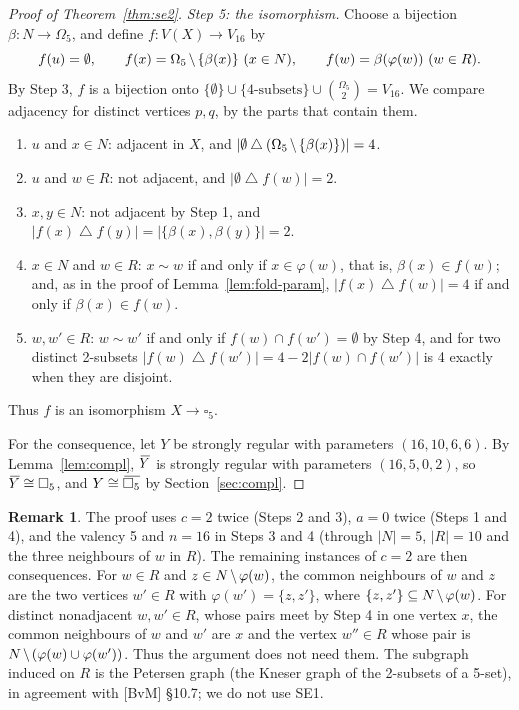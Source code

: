 \documentclass[11pt]{amsart}
\newcommand\comp[1]{{\mkern2mu\overline{\mkern-2mu#1}}}
\newcommand\diff{\mathbin{\mkern-1.5mu\setminus\mkern-1.5mu}}%
\theoremstyle{definition}
\newtheorem{remark}[theorem]{Remark}
\newcommand{\nb}{N}
\newcommand{\sd}{\mathbin{\triangle}}
\begin{document}
\begin{proof}[Proof of Theorem~\ref{thm:se2}]
\emph{Step 5: the isomorphism.} Choose a bijection $\beta\colon\nb\to\Omega_5$, and define
$f\colon V(X)\to V_{16}$ by
\[
f(u)=\emptyset,\qquad f(x)=\Omega_5\diff\{\beta(x)\}\ (x\in\nb),\qquad
f(w)=\beta(\varphi(w))\ (w\in R).
\]
By Step 3, $f$ is a bijection onto $\{\emptyset\}\cup\{\text{4-subsets}\}\cup\binom{\Omega_5}{2}=
V_{16}$. We compare adjacency for distinct vertices $p,q$, by the parts that contain them.
\begin{enumerate}
\item $u$ and $x\in\nb$: adjacent in $X$, and $\lvert\emptyset\sd(\Omega_5\diff\{\beta(x)\})\rvert=
4$.
\item $u$ and $w\in R$: not adjacent, and $\lvert\emptyset\sd f(w)\rvert=2$.
\item $x,y\in\nb$: not adjacent by Step 1, and $\lvert f(x)\sd f(y)\rvert=\lvert\{\beta(x),
\beta(y)\}\rvert=2$.
\item $x\in\nb$ and $w\in R$: $x\sim w$ if and only if $x\in\varphi(w)$, that is, $\beta(x)\in
f(w)$; and, as in the proof of Lemma~\ref{lem:fold-param}, $\lvert f(x)\sd f(w)\rvert=4$ if and
only if $\beta(x)\in f(w)$.
\item $w,w'\in R$: $w\sim w'$ if and only if $f(w)\cap f(w')=\emptyset$ by Step 4, and for two
distinct 2-subsets $\lvert f(w)\sd f(w')\rvert=4-2\lvert f(w)\cap f(w')\rvert$ is 4 exactly when
they are disjoint.
\end{enumerate}
Thus $f$ is an isomorphism $X\to\square_5$.

For the consequence, let $Y$ be strongly regular with parameters $(16,10,6,6)$. By
Lemma~\ref{lem:compl}, $\comp Y$ is strongly regular with parameters $(16,5,0,2)$, so
$\comp Y\cong\square_5$, and $Y\cong\comp{\square_5}$ by Section~\ref{sec:compl}.
\end{proof}

\begin{remark}\label{rem:se2}
The proof uses $c=2$ twice (Steps 2 and 3), $a=0$ twice (Steps 1 and 4), and the valency 5 and
$n=16$ in Steps 3 and 4 (through $\lvert\nb\rvert=5$, $\lvert R\rvert=10$ and the three neighbours
of $w$ in $R$). The remaining instances of $c=2$ are then consequences. For $w\in R$ and
$z\in\nb\diff\varphi(w)$, the common neighbours of $w$ and $z$ are the two vertices $w'\in R$ with
$\varphi(w')=\{z,z'\}$, where $\{z,z'\}\subseteq\nb\diff\varphi(w)$. For distinct nonadjacent
$w,w'\in R$, whose pairs meet by Step 4 in one vertex $x$, the common neighbours of $w$ and $w'$
are $x$ and the vertex $w''\in R$ whose pair is $\nb\diff(\varphi(w)\cup\varphi(w'))$. Thus the
argument does not need them. The subgraph induced on $R$ is the Petersen graph (the Kneser graph of the 2-subsets of a
5-set), in agreement with [BvM] \S10.7; we do not use SE1.
\end{remark}
\end{document}

